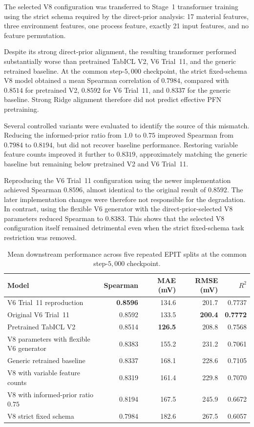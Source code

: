 \documentclass{article}
\begin{document}
The selected V8 configuration was transferred to Stage~1 transformer training using the strict schema required by the direct-prior analysis: 17 material features, three environment features, one process feature, exactly 21 input features, and no feature permutation.

Despite its strong direct-prior alignment, the resulting transformer performed substantially worse than pretrained TabICL V2, V6 Trial~11, and the generic retrained baseline. At the common step-\(5{,}000\) checkpoint, the strict fixed-schema V8 model obtained a mean Spearman correlation of \(0.7984\), compared with \(0.8514\) for pretrained V2, \(0.8592\) for V6 Trial~11, and \(0.8337\) for the generic baseline. Strong Ridge alignment therefore did not predict effective PFN pretraining.

Several controlled variants were evaluated to identify the source of this mismatch. Reducing the informed-prior ratio from \(1.0\) to \(0.75\) improved Spearman from \(0.7984\) to \(0.8194\), but did not recover baseline performance. Restoring variable feature counts improved it further to \(0.8319\), approximately matching the generic baseline but remaining below pretrained V2 and V6 Trial~11.

Reproducing the V6 Trial~11 configuration using the newer implementation achieved Spearman \(0.8596\), almost identical to the original result of \(0.8592\). The later implementation changes were therefore not responsible for the degradation. In contrast, using the flexible V6 generator with the direct-prior-selected V8 parameters reduced Spearman to \(0.8383\). This shows that the selected V8 configuration itself remained detrimental even when the strict fixed-schema task restriction was removed.

\begin{table}[htbp]
\centering
\caption{Mean downstream performance across five repeated EPIT splits at the common step-\(5{,}000\) checkpoint.}
\label{tab:direct-prior-training-results}
\begin{tabular}{lrrrr}
\hline
Model & Spearman & MAE (mV) & RMSE (mV) & \(R^2\) \\
\hline
V6 Trial~11 reproduction
    & \textbf{0.8596} & 134.6 & 201.7 & 0.7737 \\
Original V6 Trial~11
    & 0.8592 & 133.5 & \textbf{200.4} & \textbf{0.7772} \\
Pretrained TabICL V2
    & 0.8514 & \textbf{126.5} & 208.8 & 0.7568 \\
V8 parameters with flexible V6 generator
    & 0.8383 & 155.2 & 231.2 & 0.7061 \\
Generic retrained baseline
    & 0.8337 & 168.1 & 228.6 & 0.7105 \\
V8 with variable feature counts
    & 0.8319 & 161.4 & 229.8 & 0.7070 \\
V8 with informed-prior ratio \(0.75\)
    & 0.8194 & 167.5 & 245.9 & 0.6672 \\
V8 strict fixed schema
    & 0.7984 & 182.6 & 267.5 & 0.6057 \\
\hline
\end{tabular}
\end{table}
\end{document}
